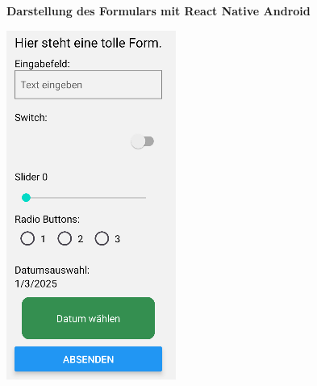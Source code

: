 \begin{figure}[H]
    \centering
    \textbf{Darstellung des Formulars mit React Native Android}\par\vspace{0.5cm}
    \begin{minipage}{0.45\textwidth}
        \centering
        \includegraphics[width=\linewidth]{images/form/android/react_native/form.png}

\end{minipage}
\end{figure}

